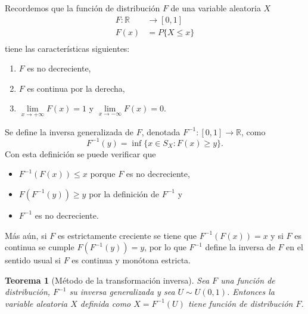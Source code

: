 \documentclass[11pt,a4paper]{article}
\newtheorem{theorem}{Teorema}[section]
\begin{document}
Recordemos que la función de distribución $F$ de una variable aleatoria $X$
\begin{align*}
F: \mathbb{R}&\to [0,1]\\
F(x) &= P\{X \leq x\}\\
\end{align*}
tiene las características siguientes:

\begin{enumerate}
\item $F$ es no decreciente,
\item $F$ es continua por la derecha,
\item $\lim\limits_{x\to +\infty}F(x) = 1$ y $\lim\limits_{x\to -\infty}F(x) = 0$.\\
\end{enumerate}

Se define la inversa generalizada de $F$, denotada $F^{-1}:[0,1]\to \mathbb{R}$, como $$F^{-1}(y) = \inf \{x\in S_X: F(x) \geq y\}.$$ Con esta definición se puede verificar que

\begin{itemize}
\item $F^{-1}(F(x)) \leq x$ porque $F$ es no decreciente,
\item $F(F^{-1}(y)) \geq y$ por la definición de $F^{-1}$ y
\item $F^{-1}$ es no decreciente.\\
\end{itemize}

Más aún, si $F$ es estrictamente creciente se tiene que $F^{-1}(F(x)) = x$ y si $F$ es continua se cumple $F(F^{-1}(y)) = y$, por lo que $F^{-1}$ define la inversa de $F$ en el sentido usual si $F$ es continua y monótona estricta.\\

\begin{theorem}[Método de la transformación inversa]
Sea $F$ una función de distribución, $F^{-1}$ su inversa generalizada y sea $U\sim U(0,1)$. Entonces la variable aleatoria $X$ definida como $X = F^{-1}(U)$ tiene función de distribución $F$.\\
\end{theorem}
\end{document}
